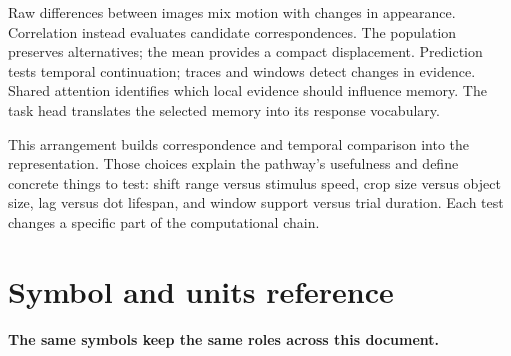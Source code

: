 \documentclass[11pt,letterpaper]{article}
\begin{document}
Raw differences between images mix motion with changes in appearance. Correlation instead evaluates candidate correspondences. The population preserves alternatives; the mean provides a compact displacement. Prediction tests temporal continuation; traces and windows detect changes in evidence. Shared attention identifies which local evidence should influence memory. The task head translates the selected memory into its response vocabulary.


This arrangement builds correspondence and temporal comparison into the representation. Those choices explain the pathway's usefulness and define concrete things to test: shift range versus stimulus speed, crop size versus object size, lag versus dot lifespan, and window support versus trial duration. Each test changes a specific part of the computational chain.


\clearpage

\section{Symbol and units reference}\label{sec18}

\textbf{The same symbols keep the same roles across this document.}
\end{document}
